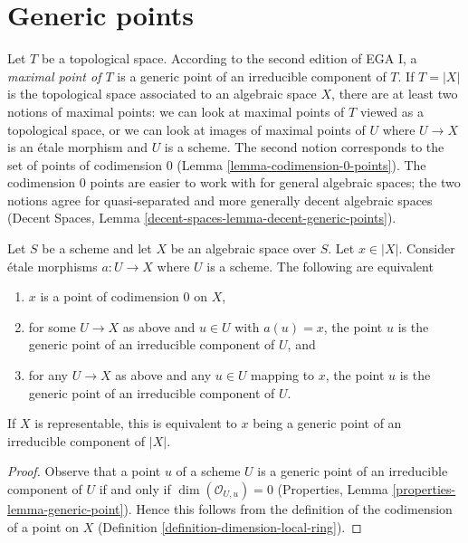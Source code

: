\section{Generic points}
\label{section-generic-points}

\noindent
Let $T$ be a topological space. According to the second edition of
EGA I, a {\it maximal point of $T$} is a generic point of an irreducible
component of $T$. If $T = |X|$ is the topological space associated to
an algebraic space $X$, there are at least two notions of maximal points:
we can look at maximal points of $T$ viewed as a topological space, or
we can look at images of maximal points of $U$ where $U \to X$ is an
\'etale morphism and $U$ is a scheme. The second notion corresponds to
the set of points of codimension $0$ (Lemma \ref{lemma-codimension-0-points}).
The codimension $0$ points are easier
to work with for general algebraic spaces; the two notions
agree for quasi-separated and more generally decent algebraic spaces
(Decent Spaces, Lemma \ref{decent-spaces-lemma-decent-generic-points}).

\begin{lemma}
\label{lemma-codimension-0-points}
Let $S$ be a scheme and let $X$ be an algebraic space over $S$.
Let $x \in |X|$. Consider \'etale morphisms $a : U \to X$ where
$U$ is a scheme. The following are equivalent
\begin{enumerate}
\item $x$ is a point of codimension $0$ on $X$,
\item for some $U \to X$ as above and $u \in U$ with $a(u) = x$,
the point $u$ is the generic point of an irreducible component of $U$, and
\item for any $U \to X$ as above and any $u \in U$ mapping to $x$,
the point $u$ is the generic point of an irreducible component of $U$.
\end{enumerate}
If $X$ is representable, this is equivalent to $x$ being a generic
point of an irreducible component of $|X|$.
\end{lemma}

\begin{proof}
Observe that a point $u$ of a scheme $U$ is a generic point of an
irreducible component of $U$ if and only if $\dim(\mathcal{O}_{U, u}) = 0$
(Properties, Lemma \ref{properties-lemma-generic-point}).
Hence this follows from the definition of the codimension of a
point on $X$ (Definition \ref{definition-dimension-local-ring}).
\end{proof}

